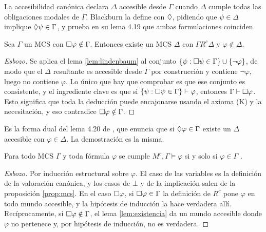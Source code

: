 La accesibilidad canónica declara $\Delta$ accesible desde $\Gamma$ cuando $\Delta$ cumple todas las obligaciones modales de $\Gamma$. Blackburn \cite[Def.~4.18]{blackburn} la define con $\lozenge$, pidiendo que $\psi \in \Delta$ implique $\lozenge\psi \in \Gamma$, y prueba en su lema 4.19 que ambas formulaciones coinciden.

\begin{lema}\label{lem:existencia}
Sea $\Gamma$ un MCS con $\square\varphi \notin \Gamma$. Entonces existe un MCS $\Delta$ con $\Gamma \mathrel{R^c} \Delta$ y $\varphi \notin \Delta$.
\end{lema}
\begin{proof}[Esbozo]
Se aplica el lema \ref{lem:lindenbaum} al conjunto $\{\psi : \square\psi \in \Gamma\} \cup \{\lnot\varphi\}$, de modo que el $\Delta$ resultante es accesible desde $\Gamma$ por construcción y contiene $\lnot\varphi$, luego no contiene $\varphi$. Lo único que hay que comprobar es que ese conjunto es consistente, y el ingrediente clave es que si $\{\psi : \square\psi \in \Gamma\} \vdash \varphi$, entonces $\Gamma \vdash \square\varphi$. Esto significa que toda la deducción puede encajonarse usando el axioma (K) y la necesitación, y eso contradice $\square\varphi \notin \Gamma$.
\end{proof}

Es la forma dual del lema 4.20 de \cite{blackburn}, que enuncia que si $\lozenge\varphi \in \Gamma$ existe un $\Delta$ accesible con $\varphi \in \Delta$. La demostración es la misma.

\begin{lema}\label{lem:verdad}
Para todo MCS $\Gamma$ y toda fórmula $\varphi$ se cumple $M^c, \Gamma \vDash \varphi$ si y solo si $\varphi \in \Gamma$ \cite[Lema~4.21]{blackburn}.
\end{lema}
\begin{proof}[Esbozo]
Por inducción estructural sobre $\varphi$. El caso de las variables es la definición de la valoración canónica, y los casos de $\bot$ y de la implicación salen de la proposición \ref{prop:mcs}. En el caso $\square\varphi$, si $\square\varphi \in \Gamma$ la definición de $R^c$ pone $\varphi$ en todo mundo accesible, y la hipótesis de inducción la hace verdadera allí. Recíprocamente, si $\square\varphi \notin \Gamma$, el lema \ref{lem:existencia} da un mundo accesible donde $\varphi$ no pertenece y, por hipótesis de inducción, no es verdadera.
\end{proof}

